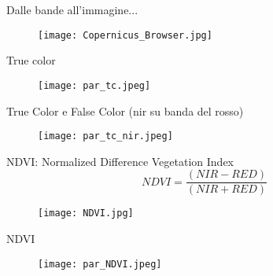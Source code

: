 \documentclass{beamer} %
\begin{document}
\begin{frame}{Dalle bande all'immagine...}
 \begin{multicols}{2}
    
    \columnbreak
    \begin{figure}
        \raggedleft %
        \texttt{[image: Copernicus\_Browser.jpg]}
    \end{figure}
    \end{multicols}
\end{frame}

\begin{frame}{True color}

\begin{figure}
    \centering
    \texttt{[image: par\_tc.jpeg]}
\end{figure}
        \end{frame}

\begin{frame}{True Color e False Color (nir su banda del rosso)}
\begin{figure}
    \centering
    \texttt{[image: par\_tc\_nir.jpeg]}
\end{figure}
        \end{frame}

 \begin{frame}{NDVI: Normalized Difference Vegetation Index}
            \begin{equation}
                NDVI = \frac{(NIR - RED)}{(NIR + RED)}
            \end{equation}
            \begin{figure}
                \centering
                \texttt{[image: NDVI.jpg]}
            \end{figure}
        \end{frame}

        
\begin{frame}{NDVI}

\begin{figure}
    \centering
    \texttt{[image: par\_NDVI.jpeg]}
\end{figure}
 \end{frame}
\end{document}
